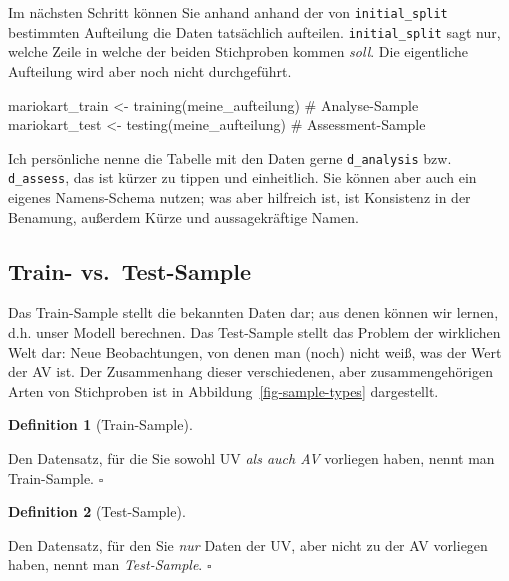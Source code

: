 \documentclass[
  letterpaper,
  twoside,
  open=any]{scrbook}
\newenvironment{Shaded}{\begin{snugshade}}{\end{snugshade}}
\newcommand{\CommentTok}[1]{\textcolor[rgb]{0.37,0.37,0.37}{#1}}
\newcommand{\FunctionTok}[1]{\textcolor[rgb]{0.28,0.35,0.67}{#1}}
\newcommand{\NormalTok}[1]{\textcolor[rgb]{0.00,0.23,0.31}{#1}}
\newcommand{\OtherTok}[1]{\textcolor[rgb]{0.00,0.23,0.31}{#1}}
\theoremstyle{definition}
\newtheorem{definition}{Definition}[chapter]
\theoremstyle{definition}
\theoremstyle{definition}
\theoremstyle{remark}
\begin{document}
Im nächsten Schritt können Sie anhand anhand der von
\texttt{initial\_split} bestimmten Aufteilung die Daten tatsächlich
aufteilen. \texttt{initial\_split} sagt nur, welche Zeile in welche der
beiden Stichproben kommen \emph{soll}. Die eigentliche Aufteilung wird
aber noch nicht durchgeführt.

\begin{Shaded}
\begin{Highlighting}[]
\NormalTok{mariokart\_train }\OtherTok{\textless{}{-}} 
  \FunctionTok{training}\NormalTok{(meine\_aufteilung)  }\CommentTok{\# Analyse{-}Sample}
\NormalTok{mariokart\_test }\OtherTok{\textless{}{-}} 
  \FunctionTok{testing}\NormalTok{(meine\_aufteilung)  }\CommentTok{\# Assessment{-}Sample}
\end{Highlighting}
\end{Shaded}

Ich persönliche nenne die Tabelle mit den Daten gerne
\texttt{d\_analysis} bzw. \texttt{d\_assess}, das ist kürzer zu tippen
und einheitlich. Sie können aber auch ein eigenes Namens-Schema nutzen;
was aber hilfreich ist, ist Konsistenz in der Benamung, außerdem Kürze
und aussagekräftige Namen.

\subsection{Train- vs.~Test-Sample}\label{train--vs.-test-sample}

Das Train-Sample stellt die bekannten Daten dar; aus denen können wir
lernen, d.h. unser Modell berechnen. Das Test-Sample stellt das Problem
der wirklichen Welt dar: Neue Beobachtungen, von denen man (noch) nicht
weiß, was der Wert der AV ist. Der Zusammenhang dieser verschiedenen,
aber zusammengehörigen Arten von Stichproben ist in
Abbildung~\ref{fig-sample-types} dargestellt.

\begin{definition}[Train-Sample]\protect\hypertarget{def-trainsample}{}\label{def-trainsample}

Den Datensatz, für die Sie sowohl UV \emph{als auch AV} vorliegen haben,
nennt man Train-Sample. \(\square\)

\end{definition}

\begin{definition}[Test-Sample]\protect\hypertarget{def-testsample}{}\label{def-testsample}

Den Datensatz, für den Sie \emph{nur} Daten der UV, aber nicht zu der AV
vorliegen haben, nennt man \emph{Test-Sample}. \(\square\)

\end{definition}
\end{document}

